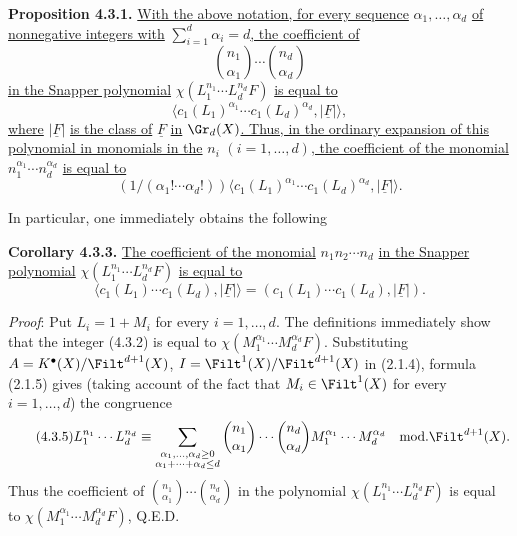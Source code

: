 %

\textbf{Proposition 4.3.1.} \uline{With the above notation, for every sequence} \(\alpha_1,\ldots,\alpha_d\) \uline{of nonnegative integers with} \(\sum_{i=1}^{d}\alpha_i=d\)\uline{, the coefficient of}
\[
 \binom{n_1}{\alpha_1}\cdots\binom{n_d}{\alpha_d}
\]
\uline{in the Snapper polynomial} \(\chi(L_1^{n_1}\cdots L_d^{n_d}F)\) \uline{is equal to}
\begin{equation}\tag{4.3.2}
 \bigl\langle c_1(L_1)^{\alpha_1}\cdots c_1(L_d)^{\alpha_d},\lvert\underline{F}\rvert\bigr\rangle,
\end{equation}
\uline{where} \(\lvert\underline{F}\rvert\) \uline{is the class of} \(\underline{F}\) \uline{in} \(\Gr_d(X)\)\uline{. Thus, in the ordinary expansion of this polynomial in monomials in the} \(n_i\) \((i=1,\ldots,d)\)\uline{, the coefficient of the monomial} \(n_1^{\alpha_1}\cdots n_d^{\alpha_d}\) \uline{is equal to}
\[
 (1/(\alpha_1! \cdots \alpha_d!))
 \bigl\langle c_1(L_1)^{\alpha_1}\cdots c_1(L_d)^{\alpha_d},\lvert\underline{F}\rvert\bigr\rangle.
\]

In particular, one immediately obtains the following

\textbf{Corollary 4.3.3.} \uline{The coefficient of the monomial} \(n_1n_2\cdots n_d\) \uline{in the Snapper polynomial} \(\chi(L_1^{n_1}\cdots L_d^{n_d}F)\) \uline{is equal to}
\begin{equation}\tag{4.3.4}
 \bigl\langle c_1(L_1)\cdots c_1(L_d),\lvert\underline{F}\rvert\bigr\rangle
 =
 (c_1(L_1)\cdots c_1(L_d),\lvert\underline{F}\rvert).
\end{equation}

\emph{Proof}: Put \(L_i=1+M_i\) for every \(i=1,\ldots,d\). The definitions immediately show that the integer (4.3.2) is equal to \(\chi(M_1^{\alpha_1}\cdots M_d^{\alpha_d}F)\). Substituting \(A=K^{\bullet}(X)/\Filt^{d+1}(X)\), \(I=\Filt^1(X)/\Filt^{d+1}(X)\) in (2.1.4), formula (2.1.5) gives (taking account of the fact that \(M_i\in\Filt^1(X)\) for every \(i=1,\ldots,d\)) the congruence
\begin{equation}\tag{4.3.5}
 L_1^{n_1}\cdots L_d^{n_d}
 \equiv
 \sum_{\substack{\alpha_1,\ldots,\alpha_d\geq0\\ \alpha_1+\cdots+\alpha_d\leq d}}
 \binom{n_1}{\alpha_1}\cdots\binom{n_d}{\alpha_d}
 M_1^{\alpha_1}\cdots M_d^{\alpha_d}
 \quad\mathrm{mod.}\Filt^{d+1}(X).
\end{equation}
Thus the coefficient of \(\binom{n_1}{\alpha_1}\cdots\binom{n_d}{\alpha_d}\) in the polynomial \(\chi(L_1^{n_1}\cdots L_d^{n_d}F)\) is equal to \(\chi(M_1^{\alpha_1}\cdots M_d^{\alpha_d}F)\), Q.E.D.

